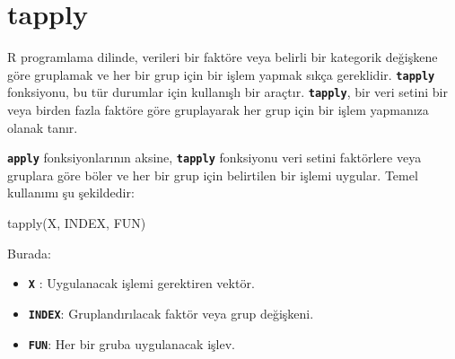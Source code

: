 \documentclass[
  letterpaper,
  DIV=11,
  numbers=noendperiod]{scrreprt}
\newenvironment{Shaded}{\begin{snugshade}}{\end{snugshade}}
\newcommand{\AttributeTok}[1]{\textcolor[rgb]{0.40,0.45,0.13}{#1}}
\newcommand{\CommentTok}[1]{\textcolor[rgb]{0.37,0.37,0.37}{#1}}
\newcommand{\DecValTok}[1]{\textcolor[rgb]{0.68,0.00,0.00}{#1}}
\newcommand{\FunctionTok}[1]{\textcolor[rgb]{0.28,0.35,0.67}{#1}}
\newcommand{\NormalTok}[1]{\textcolor[rgb]{0.00,0.23,0.31}{#1}}
\newcommand{\OtherTok}[1]{\textcolor[rgb]{0.00,0.23,0.31}{#1}}
\newcommand{\SpecialCharTok}[1]{\textcolor[rgb]{0.37,0.37,0.37}{#1}}
\newcommand{\StringTok}[1]{\textcolor[rgb]{0.13,0.47,0.30}{#1}}
\begin{document}
\section{tapply}\label{tapply}

R programlama dilinde, verileri bir faktöre veya belirli bir kategorik
değişkene göre gruplamak ve her bir grup için bir işlem yapmak sıkça
gereklidir. \textbf{\texttt{tapply}} fonksiyonu, bu tür durumlar için
kullanışlı bir araçtır. \textbf{\texttt{tapply}}, bir veri setini bir
veya birden fazla faktöre göre gruplayarak her grup için bir işlem
yapmanıza olanak tanır.

\textbf{\texttt{apply}} fonksiyonlarının aksine,
\textbf{\texttt{tapply}} fonksiyonu veri setini faktörlere veya gruplara
göre böler ve her bir grup için belirtilen bir işlemi uygular. Temel
kullanımı şu şekildedir:

\begin{Shaded}
\begin{Highlighting}[]
\FunctionTok{tapply}\NormalTok{(X, INDEX, FUN)}
\end{Highlighting}
\end{Shaded}

Burada:

\begin{itemize}
\item
  \textbf{\texttt{X}} : Uygulanacak işlemi gerektiren vektör.
\item
  \textbf{\texttt{INDEX}}: Gruplandırılacak faktör veya grup değişkeni.
\item
  \textbf{\texttt{FUN}}: Her bir gruba uygulanacak işlev.
\end{itemize}

\begin{Shaded}
\end{Shaded}
\end{document}
